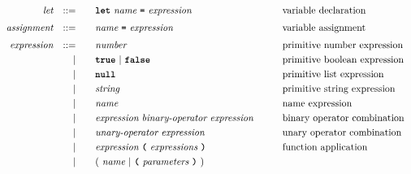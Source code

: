 \begin{alignat*}{9}
&& \textit{let}          && ::= &\quad &&  \textbf{\texttt{let}}\  \textit{name} \ 
                                           \textbf{\texttt{=}}\  \textit{expression} 
                                                            && \textrm{variable declaration}   \\[1mm]
&& \textit{assignment}   && ::= &\quad &&  \textit{name} \ 
                                           \textbf{\texttt{=}}\  \textit{expression} 
                                                            && \textrm{variable assignment}   \\[1mm]
&& \textit{expression}   && ::= &\quad &&  \textit{number}   && \textrm{primitive number expression}\\
&&                       && |   &\quad && \textbf{\texttt{true}}\ |\ \textbf{\texttt{false}}
                                                           && \textrm{primitive boolean expression}\\
&&                       && |   &\quad && \textbf{\texttt{null}}
                                                           && \textrm{primitive list expression}\\
&&                       && |   &\quad &&  \textit{string}   && \textrm{primitive string expression}\\
&&                       && |   &\quad &&  \textit{name}   && \textrm{name expression}\\
&&                       && |   &\quad &&  \textit{expression} \  \textit{binary-operator} \ 
                                            \textit{expression} \qquad
                                                           && \textrm{binary operator combination}\\
&&                       && |   &\quad &&   \textit{unary-operator} \ 
                                            \textit{expression}
                                                           && \textrm{unary operator combination}\\
&&                       && |   &\quad &&   \textit{expression} \ 
                                            \textbf{\texttt{(}}\ \textit{expressions}\
                                            \textbf{\texttt{)}}
                                                           && \textrm{function application}\\
&&                       && |   &\quad &&   (\ \textit{name}\ | \
                                               \textbf{\texttt{(}}\ \textit{parameters}\ \textbf{\texttt{)}}\
                                            )\    

\end{alignat*}

